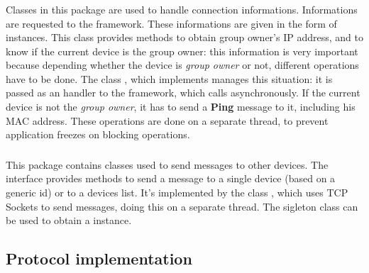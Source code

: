 	\subsubsection{}
	Classes in this package are used to handle connection informations. Informations are requested to the \direct framework. These informations are given in the form of  instances. This class provides methods to obtain group owner's IP address, and to know if the current device is the group owner: this information is very important because depending whether the device is \textit{group owner} or not, different operations have to be done. The class , which implements  manages this situation: it is passed as an handler to the \direct framework, which calls  asynchronously. 
	If the current device is not the \textit{group owner}, it has to send a \textbf{Ping} message to it, including his MAC address.
	These operations are done on a separate thread, to prevent application freezes on blocking operations.
	\\
	\subsubsection{}
	This package contains classes used to send messages to other devices. The  interface provides methods to send a message to a single device (based on a generic  id) or to a devices list. It's implemented by the class , which uses TCP Sockets to send messages, doing this on a separate thread. The sigleton class  can be used to obtain a  instance.

\subsection{Protocol implementation}

